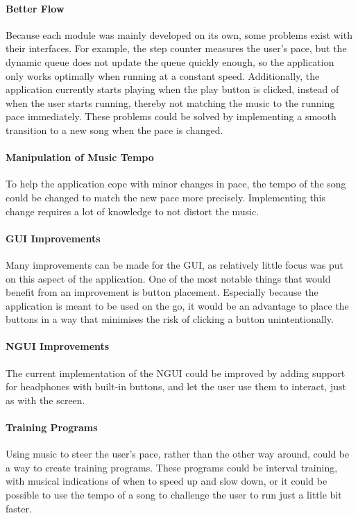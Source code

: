 \paragraph{Better Flow}
Because each module was mainly developed on its own, some problems exist with their interfaces.
For example, the step counter measures the user's pace, but the dynamic queue does not update the queue quickly enough, so the application only works optimally when running at a constant speed.
Additionally, the application currently starts playing when the play button is clicked, instead of when the user starts running, thereby not matching the music to the running pace immediately.
These problems could be solved by implementing a smooth transition to a new song when the pace is changed.

\paragraph{Manipulation of Music Tempo}
To help the application cope with minor changes in pace, the tempo of the song could be changed to match the new pace more precisely. Implementing this change requires a lot of knowledge to not distort the music.

\paragraph{GUI Improvements}
Many improvements can be made for the GUI, as relatively little focus was put on this aspect of the application. One of the most notable things that would benefit from an improvement is button placement. Especially because the application is meant to be used on the go, it would be an advantage to place the buttons in a way that minimises the risk of clicking a button unintentionally.

\paragraph{NGUI Improvements}
The current implementation of the NGUI could be improved by adding support for headphones with built-in buttons, and let the user use them to interact, just as with the screen.

\paragraph{Training Programs}
Using music to steer the user's pace, rather than the other way around, could be a way to create training programs.
These programs could be interval training, with musical indications of when to speed up and slow down, or it could be possible to use the tempo of a song to challenge the user to run just a little bit faster.

